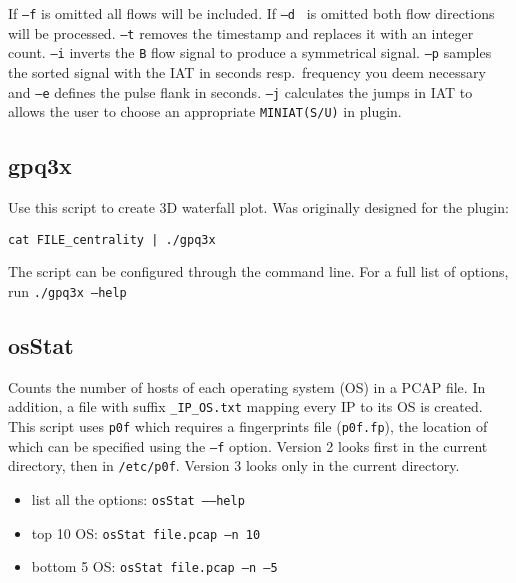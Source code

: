 \documentclass[documentation]{subfiles}
\begin{document}
If {\tt --f} is omitted all flows will be included.
If {\tt --d } is omitted both flow directions will be processed.
{\tt --t} removes the timestamp and replaces it with an integer count.
{\tt --i} inverts the {\tt B} flow signal to produce a symmetrical signal.
{\tt --p} samples the sorted signal with the IAT in seconds resp.\ frequency you deem necessary and {\tt --e} defines the pulse flank in seconds.
{\tt --j} calculates the jumps in IAT to allows the user to choose an appropriate {\tt MINIAT(S/U)} in  plugin.


\subsection{gpq3x}
Use this script to create 3D waterfall plot.
Was originally designed for the  plugin:
\begin{center}
    {\tt cat FILE\_centrality | ./gpq3x}
\end{center}
The script can be configured through the command line.
For a full list of options, run {\tt ./gpq3x --help}

\subsection{osStat}
Counts the number of hosts of each operating system (OS) in a PCAP file.
In addition, a file with suffix {\tt \_IP\_OS.txt} mapping every IP to its OS is created.
This script uses {\tt p0f} which requires a fingerprints file ({\tt p0f.fp}), the location of which can be specified using the {\tt --f} option.
Version 2 looks first in the current directory, then in {\tt /etc/p0f}.
Version 3 looks only in the current directory.
\begin{itemize}
    \item list all the options: {\tt osStat --{}--help}
    \item top 10 OS: {\tt osStat file.pcap --n 10}
    \item bottom 5 OS: {\tt osStat file.pcap --n --5}
\end{itemize}
\end{document}
